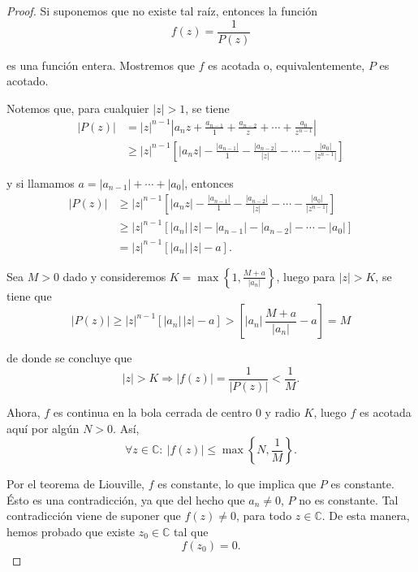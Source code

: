 \begin{proof}
Si suponemos que no existe tal raíz, entonces la función
$$f(z) = \frac{1}{P(z)}$$

es una función entera. Mostremos que $f$ es acotada o, equivalentemente, $P$ es acotado.

Notemos que, para cualquier $|z|> 1$, se tiene
\begin{align*}
    |P(z)| &= |z|^{n-1} \left| a_n z + \frac{a_{n-1}}{1} + \frac{a_{n-2}}{z} + \cdots + \frac{a_0}{z^{n-1}} \right| \\
    &\geq |z|^{n-1} \left[ |a_n z|- \frac{|a_{n-1}|}{1} - \frac{|a_{n-2}|}{|z|} - \cdots - \frac{|a_0|}{|z^{n-1}|} \right]
\end{align*}

y si llamamos $a = |a_{n-1}| + \cdots + |a_0|$, entonces
\begin{align*}
  |P(z)|  &\geq |z|^{n-1} \left[ |a_n z|- \frac{|a_{n-1}|}{1} - \frac{|a_{n-2}|}{|z|} - \cdots - \frac{|a_0|}{|z^{n-1}|} \right]  \\
  &\geq |z|^{n-1} \left[ |a_n|\,|z| - |a_{n-1}| - |a_{n-2}| - \cdots - |a_0| \right] \\
  &= |z|^{n-1} \left[ |a_n|\,|z| -a \right].
\end{align*}

Sea $M > 0$ dado y consideremos $K = \max\left\{1, \frac{M+a}{|a_n|} \right\}$, luego para $|z| > K$, se tiene que
$$|P(z)| \geq  |z|^{n-1} \left[ |a_n|\,|z| -a \right] >  \left[ |a_n|\, \frac{M+a}{|a_n|} -a \right] = M $$

de donde se concluye que
$$|z| > K \Rightarrow |f(z)| = \frac{1}{|P(z)|} < \frac{1}{M}.$$

Ahora, $f$ es continua en la bola cerrada de centro $0$ y radio $K$, luego $f$ es acotada aquí por algún $N > 0$. Así,
$$\forall z \in \mathbb{C}: ~ |f(z)| \leq \max\left\{ N,\frac{1}{M} \right\}.$$

Por el teorema de Liouville, $f$ es constante, lo que implica que $P$ es constante. Ésto es una contradicción, ya que del hecho que $a_n \neq 0$, $P$ no es constante. Tal contradicción viene de suponer que $f(z) \neq 0$, para todo $z \in \mathbb{C}$. De esta manera, hemos probado que existe $z_0 \in \mathbb{C}$ tal que
$$f(z_0) = 0.$$
\end{proof}

